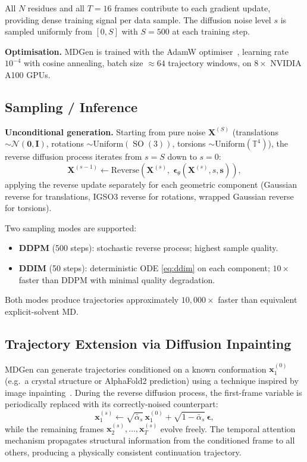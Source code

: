 \documentclass[11pt,a4paper]{article}
\DeclareMathOperator{\SO}{SO}
\newcommand{\bx}{\mathbf{x}}
\newcommand{\bX}{\mathbf{X}}
\newcommand{\bs}{\mathbf{s}}
\newcommand{\beps}{\boldsymbol{\epsilon}}
\newcommand{\TT}{\mathbb{T}}
\begin{document}
All $N$ residues and all $T = 16$ frames contribute to each gradient update, providing dense
training signal per data sample.  The diffusion noise level $s$ is sampled uniformly from
$[0, S]$ with $S = 500$ at each training step.

\textbf{Optimisation.}  MDGen is trained with the AdamW
optimiser~\cite{loshchilov2019}, learning rate $10^{-4}$ with cosine annealing, batch
size $\approx 64$ trajectory windows, on $8 \times$ NVIDIA A100 GPUs.

\subsection{Sampling / Inference}

\textbf{Unconditional generation.}  Starting from pure noise $\bX^{(S)}$ (translations
$\sim\mathcal{N}(\bm{0}, \bm{I})$, rotations $\sim \text{Uniform}(\SO(3))$, torsions
$\sim \text{Uniform}(\TT^4)$), the reverse diffusion process iterates from $s = S$ down to $s = 0$:
\begin{equation}
  \bX^{(s-1)} \gets \text{Reverse}(\bX^{(s)},\; \beps_\theta(\bX^{(s)}, s, \bs)),
\end{equation}
applying the reverse update separately for each geometric component (Gaussian reverse for
translations, IGSO3 reverse for rotations, wrapped Gaussian reverse for torsions).

Two sampling modes are supported:
\begin{itemize}[leftmargin=2em]
  \item \textbf{DDPM} (500 steps): stochastic reverse process; highest sample quality.
  \item \textbf{DDIM} (50 steps): deterministic ODE \eqref{eq:ddim} on each component;
    $10\times$ faster than DDPM with minimal quality degradation.
\end{itemize}
Both modes produce trajectories approximately $10{,}000\times$ faster than equivalent
explicit-solvent MD.

\subsection{Trajectory Extension via Diffusion Inpainting}
\label{sec:inpainting}

MDGen can generate trajectories conditioned on a known conformation $\bx_1^{(0)}$
(e.g.\ a crystal structure or AlphaFold2 prediction) using a technique inspired by image
inpainting~\cite{lugmayr2022}.  During the reverse diffusion process, the first-frame
variable is periodically replaced with its correctly-noised counterpart:
\begin{equation}
  \bx_1^{(s)} \leftarrow \sqrt{\bar\alpha_s}\,\bx_1^{(0)} + \sqrt{1-\bar\alpha_s}\,\beps,
  \label{eq:inpainting}
\end{equation}
while the remaining frames $\bx_2^{(s)}, \ldots, \bx_T^{(s)}$ evolve freely.  The temporal
attention mechanism propagates structural information from the conditioned frame to all others,
producing a physically consistent continuation trajectory.
\end{document}
